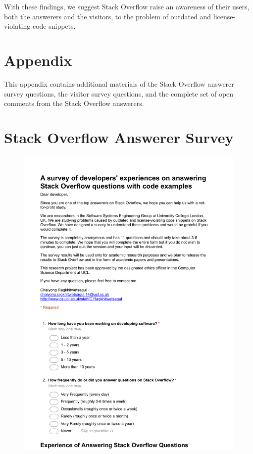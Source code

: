 \documentclass{svjour3}                     %
\begin{document}
With these findings, we
suggest Stack Overflow raise an awareness of their users, both the answerers and
the visitors, to the problem of outdated and license-violating code snippets.


%
%

 

\clearpage
\section{Appendix}

This appendix contains additional materials of the Stack Overflow answerer
survey questions, the visitor survey questions, and the complete set of open
comments from the Stack Overflow answerers.

\clearpage

\appendix
\section{Stack Overflow Answerer Survey}\label{appendixA}
\begin{figure}[H]
	\centering
	\includegraphics[width=0.8\linewidth]{answerer-1}
	\label{fig:answerer-1}
\end{figure}
\end{document}
